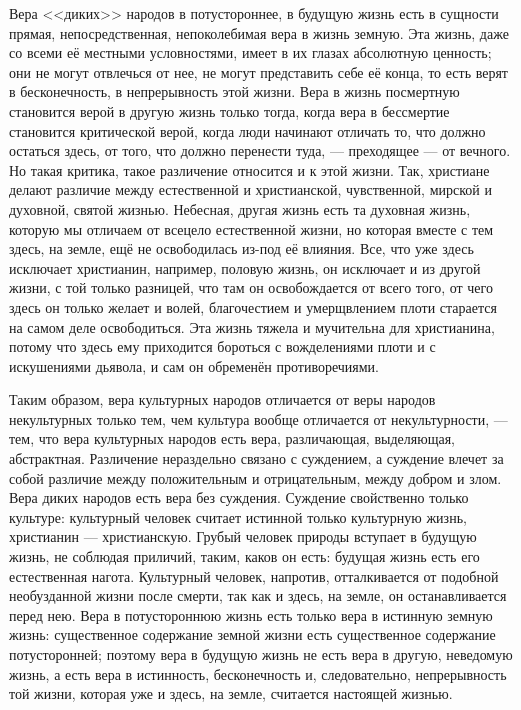 \documentclass[12pt,oneside]{book}
\begin{document}
Вера <<диких>> народов в потустороннее, в будущую жизнь есть в сущности прямая, непосредственная, непоколебимая вера в жизнь земную. Эта жизнь, даже со всеми её местными условностями, имеет в их глазах абсолютную ценность; они не могут отвлечься от нее, не могут представить себе её конца, то есть верят в бесконечность, в непрерывность этой жизни. Вера в жизнь посмертную становится верой в другую жизнь только тогда, когда вера в бессмертие становится критической верой, когда люди начинают отличать то, что должно остаться здесь, от того, что должно перенести туда, --- преходящее --- от вечного. Но такая критика, такое различение относится и к этой жизни. Так, христиане делают различие между естественной и христианской, чувственной, мирской и духовной, святой жизнью. Небесная, другая жизнь есть та духовная жизнь, которую мы отличаем от всецело естественной жизни, но которая вместе с тем здесь, на земле, ещё не освободилась из-под её влияния. Все, что уже здесь исключает христианин, например, половую жизнь, он исключает и из другой жизни, с той только разницей, что там он освобождается от всего того, от чего здесь он только желает и волей, благочестием и умерщвлением плоти старается на самом деле освободиться. Эта жизнь тяжела и мучительна для христианина, потому что здесь ему приходится бороться с вожделениями плоти и с искушениями дьявола, и сам он обременён противоречиями.

Таким образом, вера культурных народов отличается от веры народов некультурных только тем, чем культура вообще отличается от некультурности, --- тем, что вера культурных народов есть вера, различающая, выделяющая, абстрактная. Различение нераздельно связано с суждением, а суждение влечет за собой различие между положительным и отрицательным, между добром и злом. Вера диких народов есть вера без суждения. Суждение свойственно только культуре: культурный человек считает истинной только культурную жизнь, христианин --- христианскую. Грубый человек природы вступает в будущую жизнь, не соблюдая приличий, таким, каков он есть: будущая жизнь есть его естественная нагота. Культурный человек, напротив, отталкивается от подобной необузданной жизни после смерти, так как и здесь, на земле, он останавливается перед нею. Вера в потустороннюю жизнь есть только вера в истинную земную жизнь: существенное содержание земной жизни есть существенное содержание потусторонней; поэтому вера в будущую жизнь не есть вера в другую, неведомую жизнь, а есть вера в истинность, бесконечность и, следовательно, непрерывность той жизни, которая уже и здесь, на земле, считается настоящей жизнью.
\end{document}
